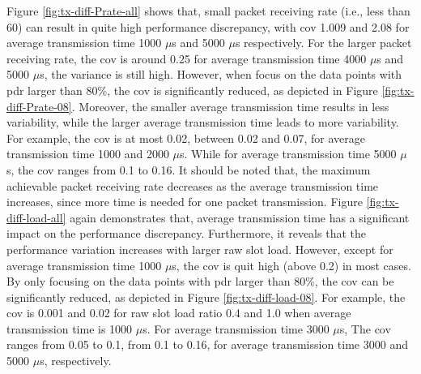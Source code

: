 Figure \ref{fig:tx-diff-Prate-all} shows that, small packet receiving rate (i.e., less than 60) can result in quite high performance discrepancy, with \gls{cov} 1.009 and 2.08 for average transmission time 1000 $\mu$s and 5000 $\mu$s respectively. For the larger packet receiving rate, the \gls{cov} is around 0.25 for average transmission time 4000 $\mu$s and 5000 $\mu$s, the variance is still high. However, when focus on the data points with \gls{pdr} larger than 80\%, the \gls{cov} is significantly reduced, as depicted in Figure \ref{fig:tx-diff-Prate-08}. Moreover, the smaller average transmission time results in less variability, while the larger average transmission time leads to more variability. For example, the \gls{cov} is at most 0.02, between 0.02 and 0.07, for average transmission time 1000 and 2000 $\mu$s. While for average transmission time 5000 $\mu$s, the \gls{cov} ranges from 0.1 to 0.16. It should be noted that, the maximum achievable packet receiving rate decreases as the average transmission time increases, since more time is needed for one packet transmission.
Figure \ref{fig:tx-diff-load-all} again demonstrates that, average transmission time has a significant impact on the performance discrepancy. Furthermore, it reveals that the performance variation increases with larger \gls{raw} slot load. However, except for average transmission time 1000 $\mu$s, the \gls{cov} is quit high (above 0.2) in most cases. By only focusing on the data points with \gls{pdr} larger than 80\%, the \gls{cov} can be significantly reduced, as depicted in Figure \ref{fig:tx-diff-load-08}.
For example, the \gls{cov} is 0.001 and 0.02 for \gls{raw} slot load ratio 0.4 and 1.0 when average transmission time is 1000 $\mu$s. For average transmission time 3000 $\mu$s, The \gls{cov} ranges from 0.05 to 0.1,  from 0.1 to 0.16, for  average transmission time 3000 and 5000  $\mu$s, respectively. 



